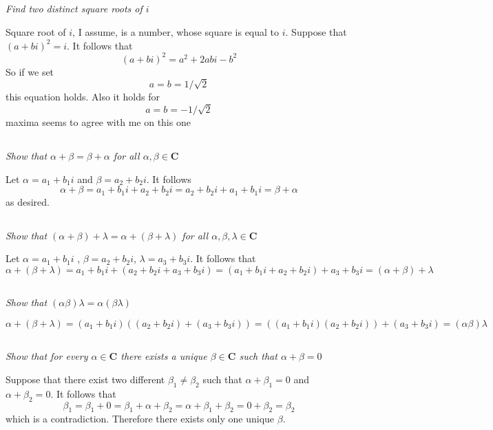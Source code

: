 \documentclass[11pt,oneside,titlepage]{book}
\begin{document}
\subsection{}
\textit{Find two distinct square roots of $i$}

Square root of $i$, I assume, is a number, whose square is equal to $i$.
Suppose that $(a + bi)^2 = i$. It follows that
$$(a + bi)^2 = a^2 + 2abi - b^2$$
So if we set $$a = b = 1/\sqrt{2}$$ this equation holds. Also it holds for
$$a = b = -1/\sqrt{2}$$
maxima seems to agree with me on this one

\subsection{}
\textit{Show that $\alpha + \beta = \beta + \alpha$ for all
  $\alpha, \beta \in \textbf{C}$}

Let $\alpha = a_1 + b_1 i$ and $\beta = a_2 + b_2 i$. It follows
$$\alpha + \beta = a_1 + b_1 i + a_2 + b_2 i = a_2 + b_2 i + a_1 + b_1 i =
\beta  + \alpha$$
as desired.

\subsection{}
\textit{Show that $(\alpha + \beta) + \lambda = \alpha + (\beta + \lambda)$
  for all  $\alpha, \beta, \lambda \in \textbf{C}$}

Let $\alpha = a_1 + b_1 i$ , $\beta = a_2 + b_2 i$, $\lambda = a_3 + b_3 i$.
It follows that 
$$\alpha + (\beta + \lambda)  = a_1 + b_1 i + (a_2 + b_2 i + a_3 + b_3 i) =
(a_1 + b_1 i + a_2 + b_2 i) + a_3 + b_3 i = 
(\alpha + \beta) + \lambda$$

\subsection{}
\textit{Show that $(\alpha \beta) \lambda = \alpha( \beta \lambda)$}

$$\alpha + (\beta + \lambda)  = (a_1 + b_1 i) ((a_2 + b_2 i) + (a_3 + b_3 i)) =
((a_1 + b_1 i)(a_2 + b_2 i)) + (a_3 + b_3 i) = 
(\alpha \beta) \lambda$$

\subsection{}
\textit{Show that for every $\alpha \in \textbf{C}$ there exists a unique
  $\beta \in \textbf{C}$ such that $\alpha + \beta = 0$}

Suppose that there exist two different $\beta_1 \neq \beta_2$ such that
$\alpha + \beta_1 = 0$ and $\alpha + \beta_2 = 0$. It follows that
$$ \beta_1 = \beta_1 + 0 =  \beta_1 + \alpha + \beta_2 = \alpha + \beta_1  + \beta_2 = 0  + \beta_2 = \beta_2$$
which is a contradiction. Therefore there exists only one unique $\beta$.
\end{document}
